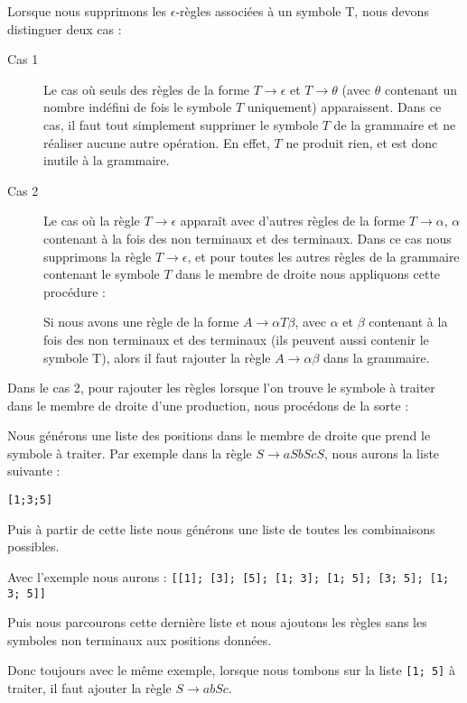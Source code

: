\documentclass[11pt,a4paper]{article}
\def\code#1{\texttt{#1}} %
\begin{document}
Lorsque nous supprimons les $\epsilon$-règles associées à un
symbole T, nous devons distinguer deux cas :
\begin{description}
    \item[Cas 1] Le cas où seuls des règles de la forme
        $T \rightarrow \epsilon$ et $T \rightarrow \theta$
        (avec $\theta$ contenant un nombre indéfini de
        fois le symbole $T$ uniquement) apparaissent. Dans ce cas, il faut
        tout simplement supprimer le symbole $T$ de la grammaire et ne réaliser
        aucune autre opération. En effet, $T$ ne produit rien, et est
        donc inutile à la grammaire.
    \item[Cas 2] Le cas où la règle $T \rightarrow \epsilon$ apparaît avec d'autres
        règles de la forme $T \rightarrow \alpha$, $\alpha$ contenant
        à la fois des non terminaux et des terminaux. Dans ce cas nous supprimons
        la règle $T \rightarrow \epsilon$, et pour toutes les autres règles de la grammaire
        contenant le symbole $T$ dans le membre de droite nous appliquons cette
        procédure :

        Si nous avons une règle de la forme $A \rightarrow \alpha T \beta$,
        avec $\alpha$ et $\beta$ contenant à la fois des non terminaux et des terminaux
        (ils peuvent aussi contenir  le symbole T), alors il faut rajouter la règle
        $A \rightarrow \alpha \beta$ dans la grammaire.
\end{description}

Dans le cas 2, pour rajouter les règles lorsque l'on trouve le symbole à traiter dans
le membre de droite d'une production, nous procédons de la sorte :

Nous générons une liste des positions dans le membre de droite que prend le symbole à traiter.
Par exemple dans la règle $S \rightarrow aSbScS$, nous aurons la liste suivante :

\code{[1;3;5]}

Puis à partir de cette liste nous générons une liste de toutes les combinaisons possibles.

Avec l'exemple nous aurons : \code{[[1]; [3]; [5]; [1; 3]; [1; 5]; [3; 5]; [1; 3; 5]]}

Puis nous parcourons cette dernière liste et nous ajoutons les règles sans les symboles
non terminaux aux positions données.

Donc toujours avec le même exemple, lorsque nous tombons sur la liste \code{[1; 5]} à traiter, il faut ajouter
la règle $S \rightarrow abSc $.
\end{document}
